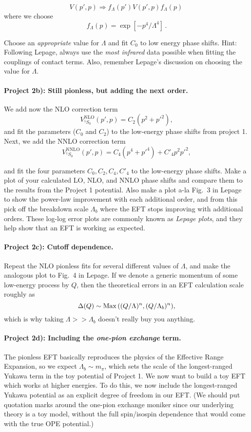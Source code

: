 \documentclass[%
oneside,                 %
final,                   %
10pt]{article}
\begin{document}
\[
V(p',p)\Rightarrow f_{\Lambda}(p')V(p',p)f_{\Lambda}(p)\,
\] 
where we choose
\[
f_{\Lambda}(p) = \exp{[-p^4/\Lambda^4]}\,.
\]

Choose an \emph{appropriate} value for $\Lambda$ and fit $C_0$ to low
energy phase shifts. Hint: Following Lepage, always use the \emph{most infrared} data possible when fitting the couplings of contact
terms. Also, remember Lepage's discussion on choosing the value for
$\Lambda$.


\paragraph{Project 2b): Still pionless, but adding the next order.}
We add now the NLO correction term
\[
V^\mathrm{NLO}_{^1S_0}(p',p)=C_2(p^2 + p'^2),
\]
and fit the parameters ($C_0$ and $C_2$) to the low-energy phase shifts from project 1. Next, we add the NNLO correction term
\[
V^\mathrm{NNLO}_{^1S_0}(p',p)=C_4(p^4 + p'^4) + C'_4 p^2p'^2,
\]

and fit the four parameters $C_0,C_2,C_4,C'_4$ to the low-energy phase
shifts.  Make a plot of your calculated LO, NLO, and NNLO phase shifts
and compare them to the results from the Project 1 potential. Also
make a plot a-la Fig.~3 in Lepage to show the power-law improvement
with each additional order, and from this pick off the breakdown scale
$\Lambda_b$ where the EFT stops improving with additional
orders. These log-log error plots are commonly known as \emph{Lepage plots}, and they help show that an EFT is working as expected.

\paragraph{Project 2c): Cutoff dependence.}
Repeat the NLO pionless fits for several different values of $\Lambda$, and make the analogous plot to Fig.~4 in Lepage. If we denote a generic momentum of some low-energy process by $Q$, then the theoretical errors in an EFT calculation scale roughly as 
\[
\Delta(Q) \sim {\rm Max}\,{((Q/\Lambda)^n, (Q/\Lambda_b)^n)},
\]
which is why taking $\Lambda >> \Lambda_b$ doesn't really buy you anything. 

\paragraph{Project 2d): Including the \emph{one-pion exchange} term.}
The pionless EFT basically reproduces the physics of the Effective
Range Expansion, so we expect $\Lambda_b\sim m_{\pi}$, which sets the
scale of the longest-ranged Yukawa term in the toy potential of
Project 1. We now want to build a toy EFT which works at higher
energies. To do this, we now include the longest-ranged Yukawa
potential as an explicit degree of freedom in our EFT. (We should put
quotation marks around the one-pion exchange moniker since our
underlying theory is a toy model, without the full spin/isospin
dependence that would come with the true OPE potential.)
\end{document}
